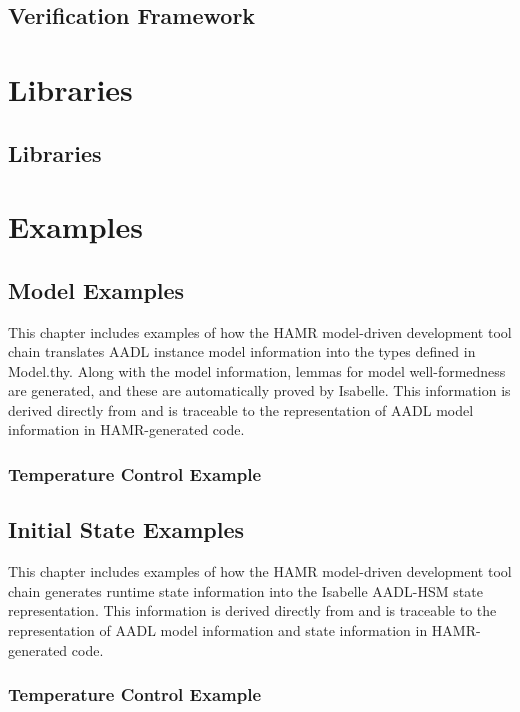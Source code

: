 \documentclass[10pt,oneside]{book}
\begin{document}


\chapter{Verification Framework}



%
%

\part{Libraries}

\chapter{Libraries}




\part{Examples}

\chapter{Model Examples}

This chapter includes examples of how the HAMR model-driven
development tool chain translates AADL instance model information into
the types defined in Model.thy.   Along with the model information,
lemmas for model well-formedness are generated, and these are
automatically proved by Isabelle.   This information is derived
directly from and is traceable to the representation of AADL model
information in HAMR-generated code.

\section{Temperature Control Example}






\chapter{Initial State Examples}

This chapter includes examples of how the HAMR model-driven
development tool chain generates runtime state information into the
Isabelle AADL-HSM state representation.  This information is derived
directly from and is traceable to the representation of AADL model
information and state information in HAMR-generated code.

\section{Temperature Control Example}


\end{document}
